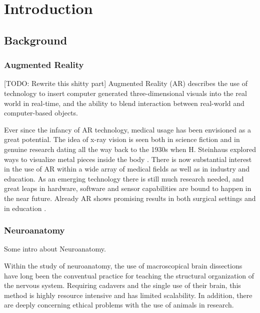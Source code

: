 \chapter{Introduction}

\section{Background}

\subsection*{Augmented Reality}
{
    \color{BrickRed}
    [TODO: Rewrite this shitty part]
    Augmented Reality (AR) describes the use of technology to insert computer generated three-dimensional visuals into the real world in real-time, and the ability to blend interaction between real-world and computer-based objects. 
}

\noindent Ever since the infancy of AR technology, medical usage has been envisioned as a great potential. The idea of x-ray vision is seen both in science fiction and in genuine research dating all the way back to the 1930s when H. Steinhaus explored ways to visualize metal pieces inside the body \citep{Sielhorst2008}. There is now substantial interest in the use of AR within a wide array of medical fields as well as in industry and education. As an emerging technology there is still much research needed, and great leaps in hardware, software and sensor capabilities are bound to happen in the near future. Already AR shows promising results in both surgical settings and in education \citep{Singh2013}.

\subsection*{Neuroanatomy}

{
    \color{BrickRed}
    Some intro about Neuroanatomy.
}

Within the study of neuroanatomy, the use of macroscopical brain dissections have long been the conventual practice for teaching the structural organization of the nervous system. Requiring cadavers and the single use of their brain, this method is highly resource intensive and has limited scalability. In addition, there are deeply concerning ethical problems with the use of animals in research. 

